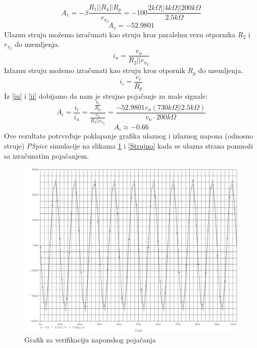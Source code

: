 \documentclass{article}
\begin{document}
            $$A_v = -\beta \frac{R_1 || R_4 || R_p}{r_{\pi_2}} = -100 \frac{2k\Omega || 4k\Omega || 200k\Omega}{2.5k\Omega}$$
            $$\boxed{A_v = -52.9801}$$
            Ulaznu struju možemo izračunati kao struju kroz paralelnu vezu otpornika $R_2$ i $r_{\pi_2}$ do uzemljenja.
            \begin{equation}
                \label{iu}
                i_u = \frac{v_u}{R_2 || r_{\pi_2}}
            \end{equation}
            Izlaznu struju možemo izračunati kao struju kroz otpornik $R_p$ do uzemljenja.
            \begin{equation}
                \label{ii}
                i_i = \frac{v_i}{R_p}
            \end{equation}
            Iz \eqref{iu} i \eqref{ii} dobijamo da nam je strujno pojačanje za male signale:
            $$A_i = \frac{i_i}{i_u} = \frac{\frac{v_i}{R_p}}{\frac{v_u}{R_2 || r_{\pi_2}}} = \frac{-52.9801 v_u (730k\Omega || 2.5k\Omega)}{v_u \cdot 200k\Omega}$$
            $$\boxed{A_i \approx -0.66}$$
            Ove rezultate potrvrđuje poklapanje grafika ulaznog i izlaznog napona (odnosno struje) \textit{PSpice} simulacije na slikama \ref{Naponsko} i \ref{Strujno} kada se ulazna strana pomnoži sa izračunatim pojačanjem.
            \begin{figure}[H]
                \centering
                \includegraphics[width=\textwidth,height=\textheight,keepaspectratio]{Naponsko.pdf}
                \caption{Grafik za verifikaciju naponskog pojačanja}
                \label{Naponsko}
            \end{figure}
\end{document}

